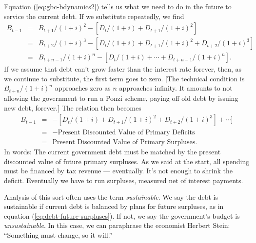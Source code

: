 Equation (\ref{eq:gbc-bdynamics2}) tells us what we need to do in the future
to service the current debt.
If we substitute repeatedly, we find
\begin{eqnarray*}
    B_{t-1}   &=&  B_{t+1}/(1+i)^2 - [D_t/(1+i)+ D_{t+1}/(1+i)^2] \\
            &=&  B_{t+2}/(1+i)^3 -
                [D_t/(1+i)+ D_{t+1}/(1+i)^2 + D_{t+2}/(1+i)^3] \\
            &=&  B_{t+n-1}/(1+i)^n -
                [D_t/(1+i)+ \cdots + D_{t+n-1}/(1+i)^n] .
\end{eqnarray*}
If we assume that debt can't grow faster than the interest rate forever,
then, as we continue to substitute, the first term goes to zero.
[The technical condition is $B_{t+n}/(1+i)^n$ approaches zero as $n$
approaches infinity.
It amounts to not allowing the government to run a Ponzi scheme, 
paying off old debt by issuing new debt, forever.]
The relation then becomes
\begin{eqnarray}
    B_{t-1}   &=&  -[D_t/(1+i)+ D_{t+1}/(1+i)^2 +
                   D_{t+2}/(1+i)^3] +   \cdots ]  \nonumber \\
            &=& - \mbox{Present Discounted Value of Primary Deficits}
                \phantom{\sum} \nonumber \\
            &=& \mbox{Present Discounted Value of Primary Surpluses} .
            \label{eq:debt-future-surpluses}
\end{eqnarray}
In words:   The current government debt must be matched
by the present discounted value of future primary surpluses.
As we said at the start, all spending must be financed by tax revenue --- eventually.
It's not enough to shrink the deficit.
Eventually we have to run surpluses, measured net of interest payments.

Analysis of this sort often uses the term {\it sustainable\/}.
We say the debt is sustainable if current debt is balanced
by plans for future surpluses, as in equation (\ref{eq:debt-future-surpluses}).
If not, we say the government's budget is {\it unsustainable\/}.
In this case, we can paraphrase the economist Herbert Stein:
``Something must change, so it will.''


\begin{comment}
Although (primary) government deficits must eventually be reversed,
they can affect the economy while they last.
One route is distribution.
If taxes are delayed long enough, the tax burden
will be shifted from current to future generations.
Thus the US contribution to World War II was financed largely with debt,
shifting some of the burden from those alive at the time to those born later.

Is deficit financing a good or bad thing?
One approach to this question is based on tax smoothing.
As we mentioned in ``Notes on taxes,''
the economic disincentives built into taxes are minimized
by having relatively constant tax rates even if tax revenues
vary over time.
On average this is likely to lead to governments running (modest)
surpluses in booms and deficits in recessions,
as tax revenues go up and down with the economy.
\end{comment}


